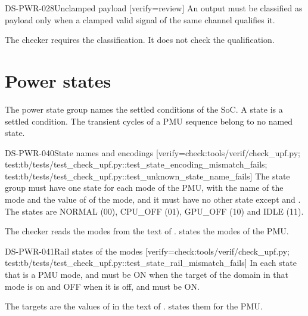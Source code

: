 \begin{requirement}{DS-PWR-028}{Unclamped payload}
[verify={review}]
An output must be classified as payload only when a clamped valid signal of the same channel qualifies it.
\end{requirement}
\begin{information}
The checker requires the classification. It does not check the qualification.
\end{information}

\section{Power states}\label{ds:ch:power-intent:states}
The power state group  names the settled conditions of the SoC. A state is a settled condition. The transient cycles of a PMU sequence belong to no named state.

\begin{requirement}{DS-PWR-040}{State names and encodings}
[verify={check:tools/verif/check_upf.py; test:tb/tests/test_check_upf.py::test_state_encoding_mismatch_fails; test:tb/tests/test_check_upf.py::test_unknown_state_name_fails}]
The state group must have one state for each mode of the PMU, with the name of the mode and the value of  of the mode, and it must have no other state except  and . The states are NORMAL (00), CPU\_OFF (01), GPU\_OFF (10) and IDLE (11).
\end{requirement}
\begin{information}
The checker reads the modes from the text of .  states the modes of the PMU.
\end{information}

\begin{requirement}{DS-PWR-041}{Rail states of the modes}
[verify={check:tools/verif/check_upf.py; test:tb/tests/test_check_upf.py::test_state_rail_mismatch_fails}]
In each state that is a PMU mode,  and  must be ON when the target of the domain in that mode is on and OFF when it is off, and  must be ON.
\end{requirement}
\begin{information}
The targets are the values of  in the text of .  states them for the PMU.
\end{information}

